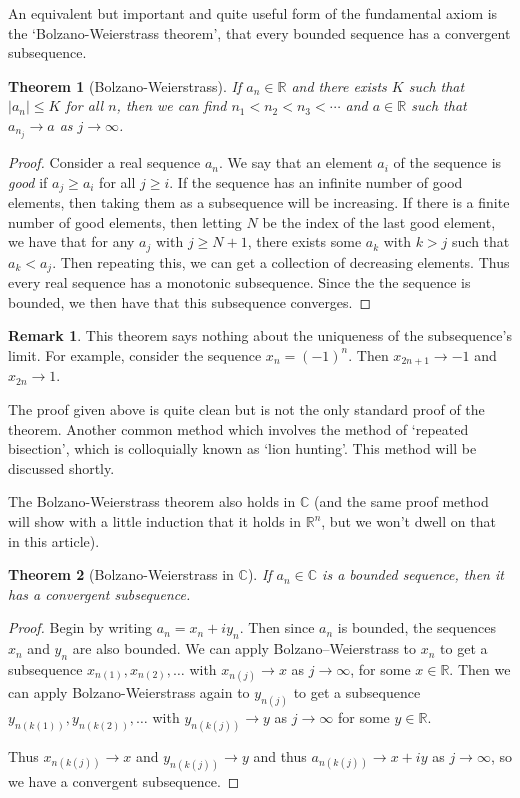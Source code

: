 \documentclass[11pt, a4paper]{article}
\newtheorem{theorem}{Theorem}[section]
\theoremstyle{definition}
\newtheorem*{remark}{Remark}
\newcommand{\C}{\mathbb{C}}
\newcommand{\R}{\mathbb{R}}
\begin{document}
An equivalent but important and quite useful form of the fundamental axiom is the `Bolzano-Weierstrass theorem', that every bounded sequence has a convergent subsequence.

\begin{theorem}[Bolzano-Weierstrass]\label{thm:bolzano}
	If $a_n \in \R$ and there exists $K$ such that $|a_n| \leq K$ for all $n$, then we can find $n_1 < n_2 < n_3 < \cdots$ and $a \in \R$ such that $a_{n_j} \rightarrow a$ as $j \rightarrow \infty$.
\end{theorem}
\begin{proof}
Consider a real sequence $a_{n}$. We say that an element $a_{i}$ of the sequence is \emph{good} if $a_{j} \geq a_{i}$ for all $j \geq i$. If the sequence has an infinite number of good elements, then taking them as a subsequence will be increasing. If there is a finite number of good elements, then letting $N$ be the index of the last good element, we have that for any $a_{j}$ with $j \geq N+1$, there exists some $a_{k}$ with $k>j$ such that $a_{k}<a_{j}$. Then repeating this, we can get a collection of decreasing elements. Thus every real sequence has a monotonic subsequence.
Since the the sequence is bounded, we then have that this subsequence converges.
\end{proof}

\begin{remark}
	This theorem says nothing about the uniqueness of the subsequence's limit. For example, consider the sequence $x_n = (-1)^n$. Then $x_{2n + 1} \rightarrow -1$ and $x_{2n} \rightarrow 1$.
\end{remark}

The proof given above is quite clean but is not the only standard proof of the theorem. Another common method which involves the method of `repeated bisection', which is colloquially known as `lion hunting'. This method will be discussed shortly. 

The Bolzano-Weierstrass theorem also holds in $\C$ (and the same proof method will show with a little induction that it holds in $\R^n$, but we won't dwell on that in this article). 

\begin{theorem}[Bolzano-Weierstrass in $\C$]
	If $a_n \in \C$ is a bounded sequence, then it has a convergent subsequence.
\end{theorem}
\begin{proof}
	Begin by writing $a_n = x_n + i y_n$. Then since $a_n$ is bounded, the sequences $x_n$ and $y_n$ are also bounded.
	We can apply Bolzano–Weierstrass to $x_n$ to get a subsequence $x_{n(1)}, x_{n(2)}, \dots$ with $x_{n(j)} \rightarrow x$ as $j \rightarrow \infty$, for some $x \in \R$.
	Then we can apply Bolzano-Weierstrass again to $y_{n(j)}$ to get a subsequence $y_{n(k(1))}, y_{n(k(2))}, \dots$ with $y_{n(k(j))} \rightarrow y$ as $j \rightarrow \infty$ for some $y \in \R$.

	Thus $x_{n(k(j))} \rightarrow x$ and $y_{n(k(j))} \rightarrow y$ and thus $a_{n(k(j))} \rightarrow x + iy$ as $j \rightarrow \infty$, so we have a convergent subsequence.
\end{proof}
\end{document}
